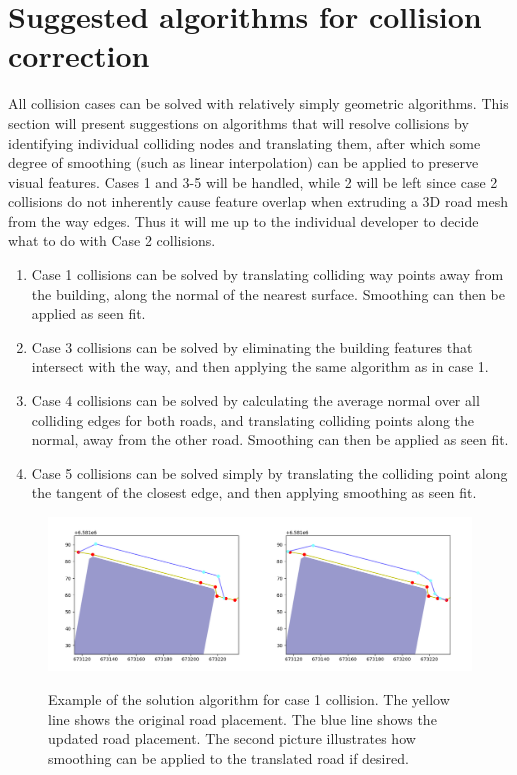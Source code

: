 \documentclass{kththesis}
\begin{document}
\section{Suggested algorithms for collision correction}

All collision cases can be solved with relatively simply geometric algorithms. This section will present suggestions on algorithms that will resolve collisions by identifying individual colliding nodes and translating them, after which some degree of smoothing (such as linear interpolation) can be applied to preserve visual features. Cases 1 and 3-5 will be handled, while 2 will be left since case 2 collisions do not inherently cause feature overlap when extruding a 3D road mesh from the way edges. Thus it will me up to the individual developer to decide what to do with Case 2 collisions.

\begin{enumerate}
\item Case 1 collisions can be solved by translating colliding way points away from the building, along the normal of the nearest surface. Smoothing can then be applied as seen fit.
\item Case 3 collisions can be solved by eliminating the building features that intersect with the way, and then applying the same algorithm as in case 1.
\item Case 4 collisions can be solved by calculating the average normal over all colliding edges for both roads, and translating colliding points along the normal, away from the other road. Smoothing can then be applied as seen fit.
\item Case 5 collisions can be solved simply by translating the colliding point along the tangent of the closest edge, and then applying smoothing as seen fit.
\end{enumerate}

\begin{figure}[H]
    \centering
    \includegraphics[width=\textwidth,height=0.5\textheight,keepaspectratio]{img_feature_overlap_fix_1}
    \label{fig:collision-case-1}
    \caption{Example of the solution algorithm for case 1 collision. The yellow line shows the original road placement. The blue line shows the updated road placement. The second picture illustrates how smoothing can be applied to the translated road if desired.}
\end{figure}
\end{document}
